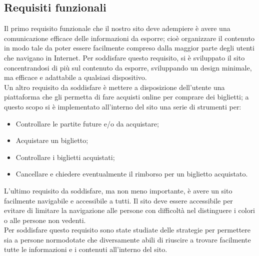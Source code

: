     \subsection{Requisiti funzionali}
    Il primo requisito funzionale che il nostro sito deve adempiere è avere una comunicazione efficace delle informazioni da esporre; cioè organizzare il contenuto in modo tale da poter essere facilmente compreso dalla maggior parte degli utenti che navigano in Internet. Per soddisfare questo requisito, si è sviluppato il sito concentrandosi di più sul contenuto da esporre, sviluppando un design minimale, ma efficace e adattabile a qualsiasi dispositivo.\\
    Un altro requisito da soddisfare è mettere a disposizione dell'utente una piattaforma che gli permetta di fare acquisti online per comprare dei biglietti; a questo scopo si è implementato all'interno del sito una serie di strumenti per:
    
    \begin{itemize}
        \item Controllare le partite future e/o da acquistare;
        \item Acquistare un biglietto;
        \item Controllare i biglietti acquistati;
        \item Cancellare e chiedere eventualmente il rimborso per un biglietto acquistato.
    \end{itemize}
    
    \noindent
    L'ultimo requisito da soddisfare, ma non meno importante, è avere un sito facilmente navigabile e accessibile a tutti. Il sito deve essere accessibile per evitare di limitare la navigazione alle persone con difficoltà nel distinguere i colori o alle persone non vedenti.\\
    Per soddisfare questo requisito sono state studiate delle strategie per permettere sia a persone normodotate che diversamente abili di riuscire a trovare facilmente tutte le informazioni e i contenuti all'interno del sito.
    
    

